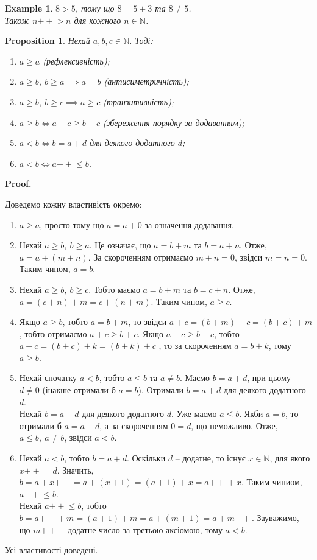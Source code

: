 \documentclass[a4paper, 14pt]{extarticle}
\makeatletter
\theoremstyle{theoremdd}
\theoremstyle{theoremdd}
\theoremstyle{theoremdd}
\theoremstyle{theoremdd}
\theoremstyle{theoremdd}
\theoremstyle{theoremdd}
\newtheorem{example}[theorem]{Example}
\theoremstyle{theoremdd}
\theoremstyle{theoremdd}
\theoremstyle{theoremdd}
\theoremstyle{theoremdd}
\newtheorem{proposition}[theorem]{Proposition}
\theoremstyle{theoremdd}
\theoremstyle{theoremdd}
\theoremstyle{theoremdd}
\theoremstyle{theoremdd}
\theoremstyle{theoremdd}
\theoremstyle{theoremdd}
\renewenvironment{proof}[1][Proof.\\]{\par
\pushQED{\hfill \qed}%
\normalfont \topsep6\p@\@plus6\p@\relax
\trivlist
\item\relax
{\bfseries
#1\@addpunct{.}}\hspace\labelsep\ignorespaces
}{%
\popQED\endtrivlist\@endpefalse
}
\newcommand{\plusplus}{\!\!\mathrel{++}}
\makeatother
\begin{document}
\begin{example}
$8 > 5$, тому що $8 = 5 + 3$ та $8 \neq 5$.\\
Також $n \plusplus > n$ для кожного $n \in \mathbb{N}$.
\end{example}

\begin{proposition}
Нехай $a,b,c \in \mathbb{N}$. Тоді:
\begin{enumerate}[nosep,wide=0pt,label={\arabic*)}]
\item $a \geq a$ (рефлексивність);
\item $a \geq b,\ b \geq a \implies a = b$ (антисиметричність);
\item $a \geq b,\ b \geq c \implies a \geq c$ (транзитивність);
\item $a \geq b \iff a + c \geq b + c$ (збереження порядку за додаванням);
\item $a < b \iff b = a + d$ для деякого додатного $d$;
\item $a < b \iff a\plusplus \leq b$.
\end{enumerate}
\end{proposition}

\begin{proof}
Доведемо кожну властивість окремо:
\begin{enumerate}[nosep,wide=0pt,label={\arabic*)}]
\item $a \geq a$, просто тому що $a = a + 0$ за означення додавання.
\item Нехай $a \geq b,\ b \geq a$. Це означає, що $a = b + m$ та $b = a + n$. Отже, $a = a + (m + n)$. За скороченням отримаємо $m + n = 0$, звідси $m = n = 0$. Таким чином, $a = b$.
\item Нехай $a \geq b,\ b \geq c$. Тобто маємо $a = b + m$ та $b = c + n$. Отже, $a = (c + n) + m = c + (n + m)$. Таким чином, $a \geq c$.
\item Якщо $a \geq b$, тобто $a = b + m$, то звідси $a + c = (b + m) + c = (b + c) + m$, тобто отримаємо $a + c \geq b + c$. Якщо $a + c \geq b + c$, тобто $a + c = (b + c) + k = (b + k) + c$ , то за скороченням $a = b + k$, тому $a \geq b$.
\item Нехай спочатку $a < b$, тобто $a \leq b$ та $a \neq b$. Маємо $b = a + d$, при цьому $d \neq 0$ (інакше отримали б $a = b$). Отримали $b = a + d$ для деякого додатного $d$.\\
Нехай $b = a + d$ для деякого додатного $d$. Уже маємо $a \leq b$. Якби $a = b$, то отримали б $a = a + d$, а за скороченням $0 = d$, що неможливо. Отже, $a \leq b,\ a \neq b$, звідси $a < b$.
\item Нехай $a < b$, тобто $b = a + d$. Оскільки $d$ -- додатне, то існує $x \in \mathbb{N}$, для якого $x\plusplus = d$. Значить, $b = a + x\plusplus = a + (x+1) = (a+1) + x = a\plusplus + x$. Таким чиниом, $a\plusplus \leq b$.\\
Нехай $a \plusplus \leq b$, тобто $b = a\plusplus + m = (a+1) + m = a + (m+1) = a + m\plusplus$. Зауважимо, що $m \plusplus$ -- додатне число за третьою аксіомою, тому $a < b$. 
\end{enumerate}
Усі властивості доведені.
\end{proof}
\end{document}
